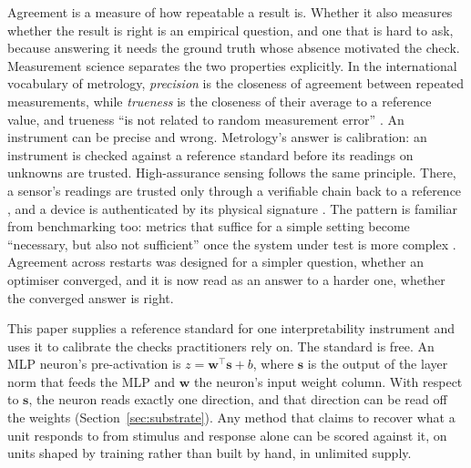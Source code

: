 \documentclass[10pt]{article}
\begin{document}
Agreement is a measure of how repeatable a result is. Whether it also measures whether the
result is right is an empirical question, and one that is hard to ask, because answering it
needs the ground truth whose absence motivated the check. Measurement science separates the
two properties explicitly. In the international vocabulary of metrology, \emph{precision}
is the closeness of agreement between repeated measurements, while \emph{trueness} is the
closeness of their average to a reference value, and trueness ``is not related to random
measurement error'' \citep{vim2012}. An instrument can be precise and wrong. Metrology's
answer is calibration: an instrument is checked against a reference standard before its
readings on unknowns are trusted. High-assurance sensing follows the same principle. There, a
sensor's readings are trusted only through a verifiable chain back to a reference
\citep{shah2020calibration}, and a device is authenticated by its physical signature
\citep{vaidya2022acoustic}. The pattern is familiar from benchmarking too: metrics that
suffice for a simple setting become ``necessary, but also not sufficient'' once the system
under test is more complex \citep{dholakia2025agentic}. Agreement across restarts was
designed for a simpler question, whether an optimiser converged, and it is now read as
an answer to a harder one, whether the converged answer is right.

This paper supplies a reference standard for one interpretability instrument and uses it to
calibrate the checks practitioners rely on. The standard is free. An MLP neuron's
pre-activation is $z = \mathbf{w}^\top \mathbf{s} + b$, where $\mathbf{s}$ is the output of
the layer norm that feeds the MLP and $\mathbf{w}$ the neuron's input weight column. With
respect to $\mathbf{s}$, the neuron reads exactly one direction, and that direction can be
read off the weights (Section~\ref{sec:substrate}). Any method that claims to recover what a
unit responds to from stimulus and response alone can be scored against it, on units shaped
by training rather than built by hand, in unlimited supply.
\end{document}
